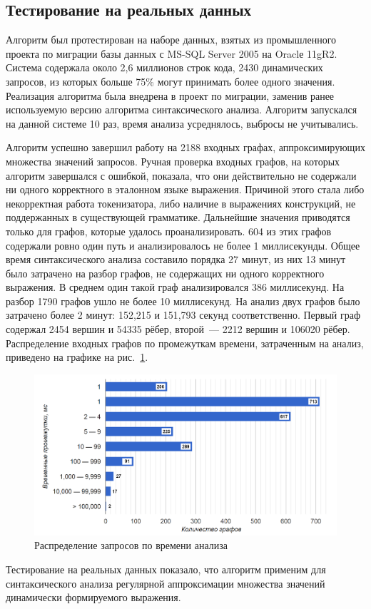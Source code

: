 \subsection{Тестирование на реальных данных}
Алгоритм был протестирован на наборе данных, взятых из промышленного проекта по миграции базы данных с MS-SQL Server 2005 на Oraclе 11gR2. Система содержала около 2,6 миллионов строк кода, 2430 динамических запросов, из которых больше 75\% могут принимать более одного значения. Реализация алгоритма была внедрена в проект по миграции, заменив ранее используемую версию алгоритма синтаксического анализа. Алгоритм запускался на данной системе 10 раз, время анализа усреднялось, выбросы не учитывались. 

Алгоритм успешно завершил работу на 2188 входных графах, аппроксимирующих множества значений запросов. Ручная проверка входных графов, на которых алгоритм завершался с ошибкой, показала, что они действительно не содержали ни одного корректного в эталонном языке выражения. Причиной этого стала либо некорректная работа токенизатора, либо наличие в выражениях конструкций, не поддержанных в существующей грамматике. Дальнейшие значения приводятся только для графов, которые удалось проанализировать. 604 из этих графов содержали ровно один путь и анализировалось не более 1 миллисекунды. Общее время синтаксического анализа составило порядка 27 минут, из них 13 минут было затрачено на разбор графов, не содержащих ни одного корректного выражения. В среднем один такой граф анализировался 386 миллисекунд. На разбор 1790 графов ушло не более 10 миллисекунд. На анализ двух графов было затрачено более 2 минут: 152,215 и 151,793 секунд соответственно. Первый граф содержал 2454 вершин и 54335 рёбер, второй~--- 2212 вершин и 106020 рёбер. Распределение входных графов по промежуткам времени, затраченным на анализ, приведено на графике на рис.~\ref{distr}.
\begin{figure}[H]
  \centering
 \includegraphics[width=\textwidth]{Verbitskaya/pics/distr.png}
 \caption{Распределение запросов по времени анализа}
 \label{distr}
\end{figure}

Тестирование на реальных данных показало, что алгоритм применим для синтаксического анализа регулярной аппроксимации множества значений динамически формируемого выражения.
